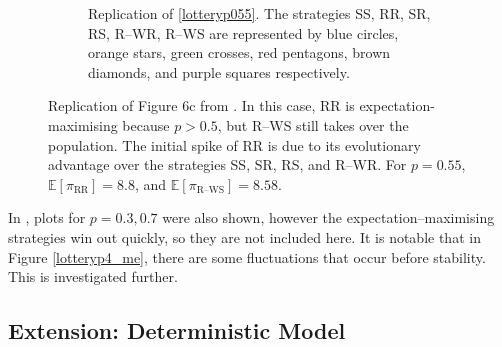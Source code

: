 \begin{figure}[!h]
\begin{subfigure}[b]{0.45\textwidth}
    \caption{Replication of \ref{lotteryp055}. The strategies SS, RR, SR, RS, R--WR, R--WS are represented by blue circles, orange stars, green crosses, red pentagons, brown diamonds, and purple squares respectively. }
    \label{lotteryp4_me_2}
  \end{subfigure}
  \caption{Replication of Figure 6c from \cite{RN30}. In this case, RR is expectation-maximising because $p>0.5$, but R--WS still takes over the population. The initial spike of RR is due to its evolutionary advantage over the strategies SS, SR, RS, and R--WR.  For $p=0.55$, $\mathbb E [\pi_{\text{RR}}] = 8.8$, and $\mathbb E [\pi_{\text{R--WS}}] =8.58 $.} \label{lottery_comp5}
\end{figure} 
\FloatBarrier
In \cite{RN30}, plots for $p=0.3, 0.7$ were also shown, however the expectation--maximising strategies win out quickly, so they are not included here. It is notable that in Figure \ref{lotteryp4_me}, there are some fluctuations that occur before stability. This is investigated further. \\
\subsection{Extension: Deterministic Model}


